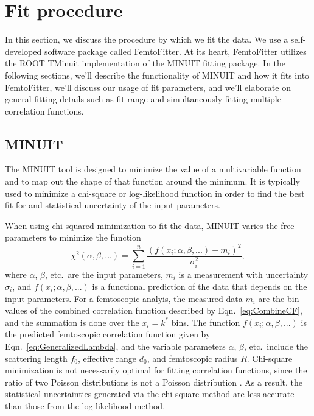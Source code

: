 \section{Fit procedure}
\label{sec:FitProcedure}

In this section, we discuss the procedure by which we fit the data.
We use a self-developed software package called FemtoFitter.
At its heart, FemtoFitter utilizes the ROOT TMinuit implementation of the MINUIT \cite{James:2004xla} fitting package.
In the following sections, we'll describe the functionality of MINUIT and how it fits into FemtoFitter, we'll discuss our usage of fit parameters, and we'll elaborate on general fitting details such as fit range and simultaneously fitting multiple correlation functions.


\subsection{MINUIT}
\label{sec:MINUIT}
The MINUIT tool is designed to minimize the value of a multivariable function and to map out the shape of that function around the minimum.
It is typically used to minimize a chi-square or log-likelihood function in order to find the best fit for and statistical uncertainty of the input parameters.

When using chi-squared minimization to fit the data, MINUIT varies the free parameters to minimize the function
\begin{equation}
\label{eq:Chisquare}
\chi^2(\alpha, \beta, ...) = \sum_{i=1}^{n} \frac{(f(x_i; \alpha, \beta, ...)-m_i)^2}{\sigma^2_i},
\end{equation}
where $\alpha$, $\beta$, etc.\ are the input parameters, $m_i$ is a measurement with uncertainty $\sigma_i$, and $f(x_i; \alpha, \beta, ...)$ is a functional prediction of the data that depends on the input parameters.
For a femtoscopic analyis, the measured data $m_i$ are the bin values of the combined correlation function described by Eqn.\ \ref{eq:CombineCF}, and the summation is done over the $x_i = k^*$ bins.
The function $f(x_i; \alpha, \beta, ...)$ is the  predicted femtoscopic correlation function given by Eqn.\ \ref{eq:GeneralizedLambda}, and the variable parameters $\alpha$, $\beta$, etc.\ include the scattering length $f_0$, effective range $d_0$, and femtoscopic radius $R$.
Chi-square minimization is not necessarily optimal for fitting correlation functions, since the ratio of two Poisson distributions is not a Poisson distribution \cite{Lisa:2005dd}.
As a result, the statistical uncertainties generated via the chi-square method are less accurate than those from the log-likelihood method.

